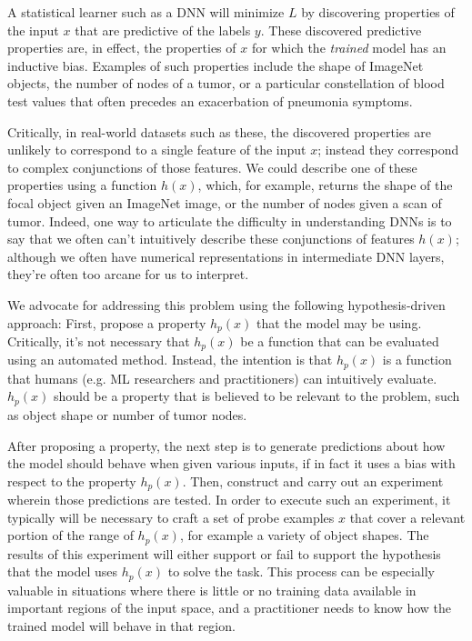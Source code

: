 \documentclass{article}
\begin{document}
A statistical learner such as a DNN will minimize $L$ by discovering properties of the input $x$ that are predictive of the labels $y$. These discovered predictive properties are, in effect, the properties of $x$ for which the \textit{trained} model has an inductive bias. Examples of such properties include the shape of ImageNet objects, the number of nodes of a tumor, or a particular constellation of blood test values that often precedes an exacerbation of pneumonia symptoms.

Critically, in real-world datasets such as these, the discovered properties are unlikely to correspond to a single feature of the input $x$; instead they correspond to complex conjunctions of those features. We could describe one of these properties using a function $h(x)$, which, for example, returns the shape of the focal object given an ImageNet image, or the number of nodes given a scan of tumor. Indeed, one way to articulate the difficulty in understanding DNNs is to say that we often can't intuitively describe these conjunctions of features $h(x)$; although we often have numerical representations in intermediate DNN layers, they're often too arcane for us to interpret.

We advocate for addressing this problem using the following hypothesis-driven approach: First, propose a property $h_p(x)$ that the model may be using. Critically, it's not necessary that $h_p(x)$ be a function that can be evaluated using an automated method. Instead, the intention is that $h_p(x)$ is a function that humans (e.g. ML researchers and practitioners) can intuitively evaluate. $h_p(x)$ should be a property that is believed to be relevant to the problem, such as object shape or number of tumor nodes.

After proposing a property, the next step is to generate predictions about how the model should behave when given various inputs, if in fact it uses a bias with respect to the property $h_p(x)$. Then, construct and carry out an experiment wherein those predictions are tested. In order to execute such an experiment, it typically will be necessary to craft a set of probe examples $x$ that cover a relevant portion of the range of $h_p(x)$, for example a variety of object shapes. The results of this experiment will either support or fail to support the hypothesis that the model uses $h_p(x)$ to solve the task. This process can be especially valuable in situations where there is little or no training data available in important regions of the input space, and a practitioner needs to know how the trained model will behave in that region.  
\end{document}
